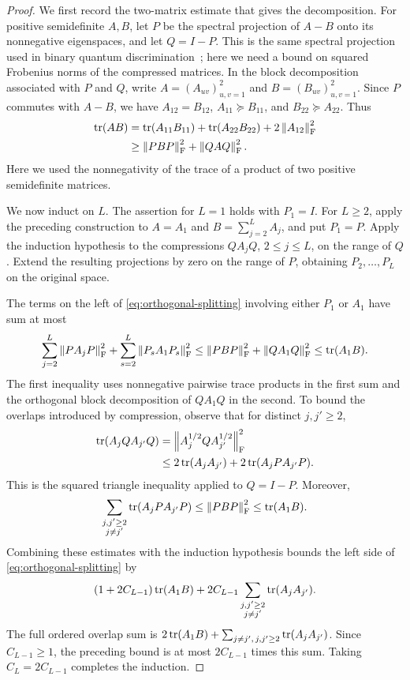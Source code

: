 \begin{proof}
We first record the two-matrix estimate that gives the decomposition.
For positive semidefinite $A,B$, let $P$ be the spectral projection of
$A-B$ onto its nonnegative eigenspaces, and let $Q=I-P$.
This is the same spectral projection used in binary quantum
discrimination~\cite{helstrom}; here we need a bound on squared
Frobenius norms of the compressed matrices.
In the block decomposition associated with $P$ and $Q$, write
$A=(A_{uv})_{u,v=1}^2$ and $B=(B_{uv})_{u,v=1}^2$.
Since $P$ commutes with $A-B$, we have
$A_{12}=B_{12}$, $A_{11}\succeq B_{11}$, and
$B_{22}\succeq A_{22}$.  Thus
\begin{equation}\label{eq:two-matrix-splitting}
\begin{split}
  \operatorname{tr}(AB)
  &=\operatorname{tr}(A_{11}B_{11})+\operatorname{tr}(A_{22}B_{22})
       +2\left\lVert A_{12}\right\rVert_{\mathrm F}^2\\
  &\ge \left\lVert PBP\right\rVert_{\mathrm F}^2+\left\lVert QAQ\right\rVert_{\mathrm F}^2.
\end{split}
\end{equation}
Here we used the nonnegativity of the trace of a product of two
positive semidefinite matrices.

We now induct on $L$.  The assertion for $L=1$ holds with $P_1=I$.
For $L\ge2$, apply the preceding construction to
$A=A_1$ and $B=\sum_{j=2}^L A_j$, and put $P_1=P$.
Apply the induction hypothesis to the compressions $QA_jQ$, $2\le j\le L$,
on the range of $Q$.  Extend the resulting projections by zero on the
range of $P$, obtaining $P_2,\ldots,P_L$ on the original space.

The terms on the left of \eqref{eq:orthogonal-splitting} involving
either $P_1$ or $A_1$ have sum at most
\begin{equation}\label{eq:splitting-first-label}
  \sum_{j=2}^L\left\lVert PA_jP\right\rVert_{\mathrm F}^2
    +\sum_{s=2}^L\left\lVert P_sA_1P_s\right\rVert_{\mathrm F}^2
  \le \left\lVert PBP\right\rVert_{\mathrm F}^2+\left\lVert QA_1Q\right\rVert_{\mathrm F}^2
  \le \operatorname{tr}(A_1B).
\end{equation}
The first inequality uses nonnegative pairwise trace products in the
first sum and the orthogonal block decomposition of $QA_1Q$ in the
second.  To bound the overlaps introduced by compression, observe that
for distinct $j,j'\ge2$,
\begin{equation}\label{eq:compressed-overlap}
\begin{split}
  \operatorname{tr}(A_jQA_{j'}Q)
  &=\left\lVert A_j^{1/2}QA_{j'}^{1/2}\right\rVert_{\mathrm F}^2\\
  &\le 2\operatorname{tr}(A_jA_{j'})+2\operatorname{tr}(A_jPA_{j'}P).
\end{split}
\end{equation}
This is the squared triangle inequality applied to $Q=I-P$.
Moreover,
\[
  \sum_{\substack{j,j'\ge2\\j\ne j'}}\operatorname{tr}(A_jPA_{j'}P)
  \le \left\lVert PBP\right\rVert_{\mathrm F}^2
  \le \operatorname{tr}(A_1B).
\]
Combining these estimates with the induction hypothesis bounds the
left side of \eqref{eq:orthogonal-splitting} by
\[
  (1+2C_{L-1})\operatorname{tr}(A_1B)
  +2C_{L-1}\sum_{\substack{j,j'\ge2\\j\ne j'}}\operatorname{tr}(A_jA_{j'}).
\]
The full ordered overlap sum is
$2\operatorname{tr}(A_1B)+\sum_{j\ne j',\,j,j'\ge2}\operatorname{tr}(A_jA_{j'})$.
Since $C_{L-1}\ge1$, the preceding bound is at most
$2C_{L-1}$ times this sum.  Taking $C_L=2C_{L-1}$ completes the induction.
\end{proof}
